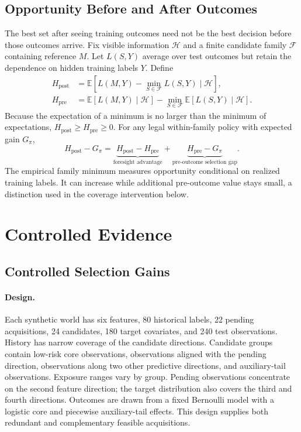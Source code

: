 \documentclass[runningheads]{llncs}
\begin{document}
\subsection{Opportunity Before and After Outcomes}
The best set after seeing training outcomes need not be the best decision before those outcomes arrive. Fix visible information $\mathcal H$ and a finite candidate family $\mathcal F$ containing reference $M$. Let $L(S,Y)$ average over test outcomes but retain the dependence on hidden training labels $Y$. Define
\begin{align}
 H_{\mathrm{post}}&=\mathbb E\!\left[L(M,Y)-\min_{S\in\mathcal F}L(S,Y)\mid\mathcal H\right],\label{eq:post}\\
 H_{\mathrm{pre}}&=\mathbb E[L(M,Y)\mid\mathcal H]
      -\min_{S\in\mathcal F}\mathbb E[L(S,Y)\mid\mathcal H].\label{eq:pre}
\end{align}
Because the expectation of a minimum is no larger than the minimum of expectations,
$H_{\mathrm{post}}\geq H_{\mathrm{pre}}\geq0$.
For any legal within-family policy with expected gain $G_\pi$,
\begin{equation}
 H_{\mathrm{post}}-G_\pi
  =\underbrace{H_{\mathrm{post}}-H_{\mathrm{pre}}}_{\text{foresight advantage}}
   +\underbrace{H_{\mathrm{pre}}-G_\pi}_{\text{pre-outcome selection gap}}.\label{eq:opportunity}
\end{equation}
The empirical family minimum measures opportunity conditional on realized training labels. It can increase while additional pre-outcome value stays small, a distinction used in the coverage intervention below.

\section{Controlled Evidence}
\label{sec:controlled}

\subsection{Controlled Selection Gains}
\paragraph{Design.}
Each synthetic world has six features, 80 historical labels, 22 pending acquisitions, 24 candidates, 180 target covariates, and 240 test observations. History has narrow coverage of the candidate directions. Candidate groups contain low-risk core observations, observations aligned with the pending direction, observations along two other predictive directions, and auxiliary-tail observations. Exposure ranges vary by group. Pending observations concentrate on the second feature direction; the target distribution also covers the third and fourth directions. Outcomes are drawn from a fixed Bernoulli model with a logistic core and piecewise auxiliary-tail effects. This design supplies both redundant and complementary feasible acquisitions.
\end{document}
